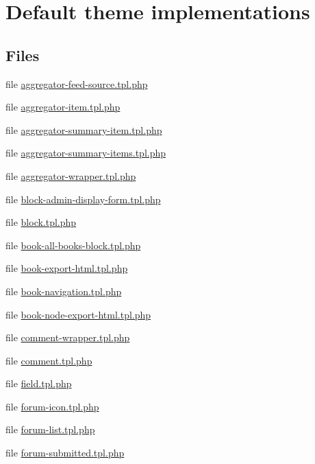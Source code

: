 \hypertarget{group__themeable}{
\section{Default theme implementations}
\label{group__themeable}
}
\subsection*{Files}
\begin{DoxyCompactItemize}
\item 
file \hyperlink{aggregator-feed-source_8tpl_8php}{aggregator-\/feed-\/source.tpl.php}
\item 
file \hyperlink{aggregator-item_8tpl_8php}{aggregator-\/item.tpl.php}
\item 
file \hyperlink{aggregator-summary-item_8tpl_8php}{aggregator-\/summary-\/item.tpl.php}
\item 
file \hyperlink{aggregator-summary-items_8tpl_8php}{aggregator-\/summary-\/items.tpl.php}
\item 
file \hyperlink{aggregator-wrapper_8tpl_8php}{aggregator-\/wrapper.tpl.php}
\item 
file \hyperlink{block-admin-display-form_8tpl_8php}{block-\/admin-\/display-\/form.tpl.php}
\item 
file \hyperlink{block_8tpl_8php}{block.tpl.php}
\item 
file \hyperlink{book-all-books-block_8tpl_8php}{book-\/all-\/books-\/block.tpl.php}
\item 
file \hyperlink{book-export-html_8tpl_8php}{book-\/export-\/html.tpl.php}
\item 
file \hyperlink{book-navigation_8tpl_8php}{book-\/navigation.tpl.php}
\item 
file \hyperlink{book-node-export-html_8tpl_8php}{book-\/node-\/export-\/html.tpl.php}
\item 
file \hyperlink{modules_2comment_2comment-wrapper_8tpl_8php}{comment-\/wrapper.tpl.php}
\item 
file \hyperlink{modules_2comment_2comment_8tpl_8php}{comment.tpl.php}
\item 
file \hyperlink{field_8tpl_8php}{field.tpl.php}
\item 
file \hyperlink{forum-icon_8tpl_8php}{forum-\/icon.tpl.php}
\item 
file \hyperlink{forum-list_8tpl_8php}{forum-\/list.tpl.php}
\item 
file \hyperlink{forum-submitted_8tpl_8php}{forum-\/submitted.tpl.php}

\end{DoxyCompactItemize}
